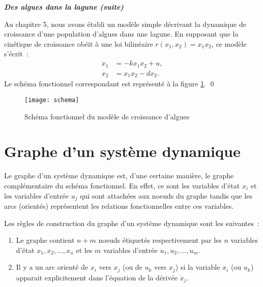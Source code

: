 \begin{exemple}{\bf \em Des algues dans la lagune (suite)}

Au chapitre 5, nous avons établi un modèle simple décrivant la dynamique de croissance d'une population d'algues dans une lagune. En supposant que la cinétique de croissance obéit à une loi bilinéaire $r(x_1,x_2) = x_1x_2$, ce modèle s'écrit~:
\begin{equation*} \begin{split}
\dot x_1 &= -kx_1x_2 + u, \\
\dot x_2 &= x_1x_2 - dx_2.
\end{split} \end{equation*}
Le schéma fonctionnel correspondant est représenté à la figure 
\ref{Fig:schema}. \qed
\begin{figure}[htbp] 
   \centering
   \texttt{[image: schema]} 
   \caption{Schéma fonctionnel du modèle de croissance d'algues}
   \label{Fig:schema}
\end{figure}
\end{exemple}

\section{Graphe d'un système dynamique}

Le graphe d'un système dynamique est, d'une certaine manière, le graphe complémentaire du schéma fonctionnel. En effet, ce sont les variables d'état $x_i$ et les variables d'entrée $u_j$ qui sont attachées aux noeuds du graphe tandis que les arcs (orientés) représentent les relations fonctionnelles entre ces variables.

Les règles de construction du graphe d'un système dynamique sont les suivantes~:
\begin{enumerate}
\item Le graphe contient $n+m$ noeuds étiquetés respectivement par les $n$ variables d'état $x_1, x_2, \dots , x_n$ et les $m$ variables d'entrée $u_1,u_2, \dots , u_m$.
\item Il y a un arc orienté de $x_i$ vers $x_j$ (ou de $u_k$ vers $x_j$) si la variable $x_i$ (ou $u_k$) apparait explicitement dans l'équation de la dérivée $\dot x_j$.
\end{enumerate}
\vv

